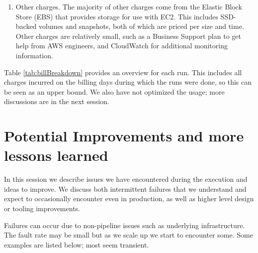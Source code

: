 \begin{enumerate}
\item Other charges.
The majority of other charges come from the Elastic Block Store (EBS) that provides storage for use with EC2.
This includes SSD-backed volumes and snapshots, both of which are priced per size and time.
Other charges are relatively small, such as a Business Support plan to get help from AWS engineers, and CloudWatch for additional monitoring information.

\end{enumerate}

Table \ref{tab:billBreakdown} provides an overview for each run.
This includes all charges incurred on the billing days during which the runs were done, so this can be seen as an upper bound.
We also have not optimized the usage; more discussions are in the next session.




\section{Potential Improvements and more lessons learned} \label{future}

In this session we describe issues we have encountered during the execution and ideas to improve.
We discuss both intermittent failures that we understand and expect to occasionally encounter even in production, as well as higher level design or tooling improvements.

Failures can occur due to non-pipeline issues such as underlying infrastructure.
The fault rate may be small but as we scale up we start to encounter some.
Some examples are listed below; most seem transient.


